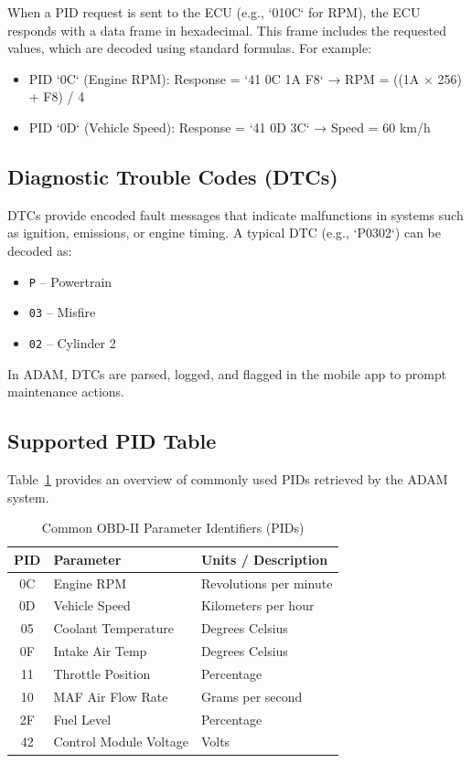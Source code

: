 When a PID request is sent to the ECU (e.g., `010C` for RPM), the ECU responds with a data frame in hexadecimal. This frame includes the requested values, which are decoded using standard formulas. For example:

\begin{itemize}
    \item PID `0C` (Engine RPM): Response = `41 0C 1A F8` → RPM = ((1A × 256) + F8) / 4
    \item PID `0D` (Vehicle Speed): Response = `41 0D 3C` → Speed = 60 km/h
\end{itemize}

\subsection{Diagnostic Trouble Codes (DTCs)}

DTCs provide encoded fault messages that indicate malfunctions in systems such as ignition, emissions, or engine timing. A typical DTC (e.g., `P0302`) can be decoded as:
\begin{itemize}
    \item \texttt{P} – Powertrain
    \item \texttt{03} – Misfire
    \item \texttt{02} – Cylinder 2
\end{itemize}

In ADAM, DTCs are parsed, logged, and flagged in the mobile app to prompt maintenance actions.

\subsection{Supported PID Table}

Table~\ref{tab:obd_pids} provides an overview of commonly used PIDs retrieved by the ADAM system.

\begin{table}[h]
\centering
\caption{Common OBD-II Parameter Identifiers (PIDs)}
\begin{tabular}{|c|l|l|}
\hline
\textbf{PID} & \textbf{Parameter} & \textbf{Units / Description} \\
\hline
0C & Engine RPM & Revolutions per minute \\
0D & Vehicle Speed & Kilometers per hour \\
05 & Coolant Temperature & Degrees Celsius \\
0F & Intake Air Temp & Degrees Celsius \\
11 & Throttle Position & Percentage \\
10 & MAF Air Flow Rate & Grams per second \\
2F & Fuel Level & Percentage \\
42 & Control Module Voltage & Volts \\
\hline
\end{tabular}
\label{tab:obd_pids}
\end{table}

